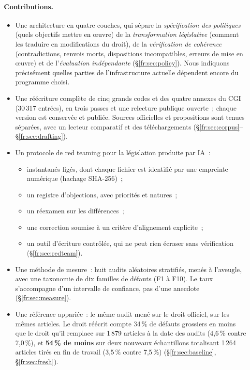 \documentclass[11pt,a4paper]{article}
\begin{document}
\paragraph{Contributions.}
\begin{itemize}
  \item Une architecture en quatre couches, qui sépare la \emph{spécification des politiques} (quels objectifs mettre en \oe{}uvre) de la \emph{transformation législative} (comment les traduire en modifications du droit), de la \emph{vérification de cohérence} (contradictions, renvois morts, dispositions incompatibles, erreurs de mise en \oe{}uvre) et de l'\emph{évaluation indépendante} (\S\ref{fr:sec:policy}). Nous indiquons précisément quelles parties de l'infrastructure actuelle dépendent encore du programme choisi.
  \item Une réécriture complète de cinq grands codes et des quatre annexes du CGI (30\,317 entrées), en trois passes et une relecture publique ouverte~; chaque version est conservée et publiée. Sources officielles et propositions sont tenues séparées, avec un lecteur comparatif et des téléchargements (\S\ref{fr:sec:corpus}--\S\ref{fr:sec:drafting}).
  \item Un protocole de \og red teaming \fg{} pour la législation produite par IA~:
  \begin{itemize}
    \item instantanés figés, dont chaque fichier est identifié par une empreinte numérique (hachage SHA-256)~;
    \item un registre d'objections, avec priorités et natures~;
    \item un réexamen sur les différences~;
    \item une correction soumise à un critère d'alignement explicite~;
    \item un outil d'écriture contrôlée, qui ne peut rien écraser sans vérification (\S\ref{fr:sec:redteam}).
  \end{itemize}
  \item Une méthode de mesure~: huit audits aléatoires stratifiés, menés à l'aveugle, avec une taxonomie de dix familles de défauts (F1 à F10). Le taux s'accompagne d'un intervalle de confiance, pas d'une anecdote (\S\ref{fr:sec:measure}).
  \item Une référence appariée~: le même audit mené sur le droit officiel, sur les mêmes articles. Le droit réécrit compte 34\,\% de défauts grossiers en moins que le droit qu'il remplace sur 1\,879 articles à la date des audits (4,6\,\% contre 7,0\,\%), et \textbf{54\,\% de moins} sur deux nouveaux échantillons totalisant 1\,264 articles tirés en fin de travail (3,5\,\% contre 7,5\,\%) (\S\ref{fr:sec:baseline}, \S\ref{fr:sec:fresh}).

\end{itemize}
\end{document}
